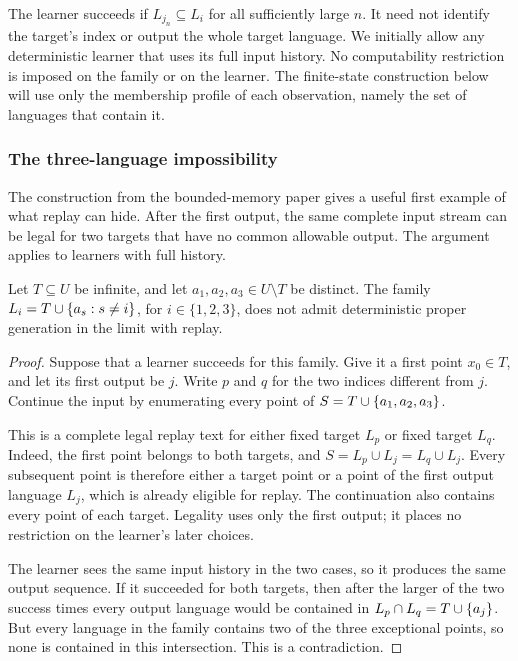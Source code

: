 The learner succeeds if $L_{j_n}\subseteq L_i$ for all sufficiently large
$n$. It need not identify the target's index or output the whole target
language. We initially allow any deterministic learner that uses its full
input history. No computability restriction is imposed on the family or
on the learner. The finite-state construction below will use only the
membership profile of each observation, namely the set of languages that
contain it.

\subsubsection{The three-language impossibility}
\label{app:replay:construction}

The construction from the bounded-memory paper gives a useful first
example of what replay can hide. After the first output, the same complete
input stream can be legal for two targets that have no common allowable
output. The argument applies to learners with full history.

\begin{suppprop}
\label{app:replay:prop:triangle}
Let $T\subseteq U$ be infinite, and let $a_1,a_2,a_3\in U\setminus T$
be distinct. The family $L_i=T\cup\{a_s:s\ne i\}$, for
$i\in\{1,2,3\}$, does not admit deterministic proper generation in the
limit with replay.
\end{suppprop}

\begin{proof}
Suppose that a learner succeeds for this family. Give it a first point
$x_0\in T$, and let its first output be $j$. Write $p$ and $q$ for the
two indices different from $j$. Continue the input by enumerating every
point of $S=T\cup\{a_1,a_2,a_3\}$.

This is a complete legal replay text for either fixed target $L_p$ or
fixed target $L_q$. Indeed, the first point belongs to both targets,
and $S=L_p\cup L_j=L_q\cup L_j$. Every subsequent point is therefore
either a target point or a point of the first output language $L_j$,
which is already eligible for replay. The continuation also contains
every point of each target. Legality uses only the first output; it
places no restriction on the learner's later choices.

The learner sees the same input history in the two cases, so it produces
the same output sequence. If it succeeded for both targets, then after
the larger of the two success times every output language would be
contained in $L_p\cap L_q=T\cup\{a_j\}$. But every language in
the family contains two of the three exceptional points, so none is
contained in this intersection. This is a contradiction.
\end{proof}


